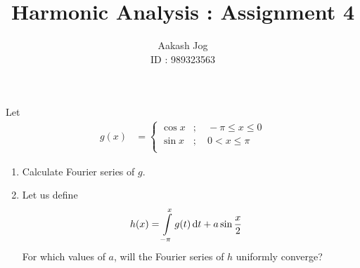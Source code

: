 \documentclass[fleqn, a4paper, 11pt, oneside]{amsart}
\title{Harmonic Analysis : Assignment 4}
\author
{
	Aakash Jog\\
	ID : 989323563
}
\date{\formatdate{24}{11}{2015}}
\theoremstyle{definition}
\theoremstyle{theorem}
\begin{document}

\maketitle

\begin{question}
	Let
	\begin{align*}
		g(x) &=
			\begin{cases}
				\cos x & ;\quad -\pi \le x \le 0 \\
				\sin x & ;\quad 0 < x \le \pi    \\
			\end{cases}
	\end{align*}
	\begin{enumerate}
		\item
			Calculate Fourier series of $g$.
		\item
			Let us define
			\begin{align*}
				h(x) & = \int\limits_{-\pi}^{x} g(t) \dif t + a \sin \frac{x}{2}
			\end{align*}
			For which values of $a$, will the Fourier series of $h$ uniformly converge?
	\end{enumerate}
\end{question}
\end{document}
